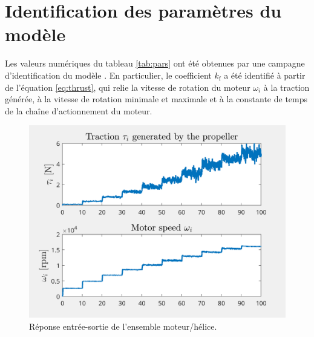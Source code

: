 \section{Identification des paramètres du modèle}
    Les valeurs numériques du tableau \ref{tab:pars} ont été obtenues par une campagne d'identification du modèle \cite{sansouStage}. En particulier, le coefficient $k_{\text{f}}$ a été identifié à partir de l'équation \eqref{eq:thrust}, qui relie la vitesse de rotation du moteur $\omega_{i}$ à la traction générée, à la vitesse de rotation minimale et maximale et à la constante de temps de la chaîne d'actionnement du moteur.
    \begin{figure}[ht!]
        \centerline{
        \includegraphics[trim=0cm 0cm 0cm 0cm,clip,width=0.5\columnwidth]{figures/ident_motor March 27 2024 1651.png}}
        \caption{Réponse entrée-sortie de l'ensemble moteur/hélice.}
        \label{fig:IOmot}
    \end{figure}
    
  
    


    

